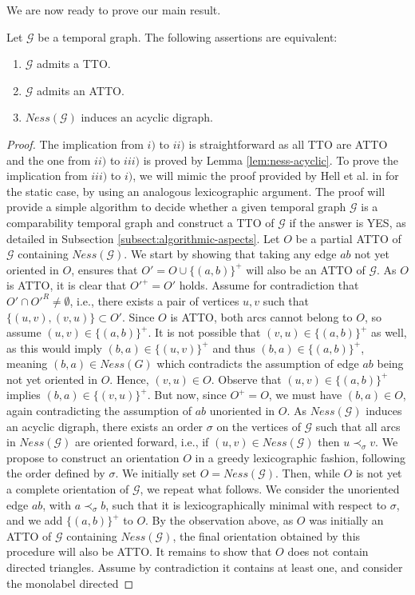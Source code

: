\documentclass[runningheads]{llncs}
\def\mG{\mathcal{G}}
\begin{document}
We are now ready to prove our main result.

\begin{theorem}
 Let $\mathcal{G}$ be a temporal graph. The following assertions are equivalent:
\begin{enumerate}[label=\roman*)]
     \item $\mG$ admits a TTO.
     \item $\mathcal{G}$ admits an ATTO.
     \item $Ness(\mathcal{G})$ induces an acyclic digraph.
\end{enumerate}
\label{theo:gouila-houri-generalization}
\end{theorem}

\begin{proof}
The implication from $i)$ to $ii)$ is straightforward as all TTO are ATTO and the one from $ii)$ to $iii)$ is proved by Lemma \ref{lem:ness-acyclic}. To prove the implication from $iii)$ to $i)$, we will mimic the proof provided by Hell et al. in \cite{hell1995lexicographic} for the static case, by using an analogous lexicographic argument. The proof will provide a simple algorithm to decide whether a given temporal graph $\mathcal{G}$ is a comparability temporal graph and construct a TTO of $\mathcal{G}$ if the answer is YES, as detailed in Subsection \ref{subsect:algorithmic-aspects}. Let $O$ be a partial ATTO of $\mathcal{G}$ containing $Ness(\mathcal{G})$. We start by showing that taking any edge $ab$ not yet oriented in $O$, ensures that $O'=O\cup\{(a,b)\}^+$ will also be an ATTO of $\mathcal{G}$. As $O$ is ATTO, it is clear that $O'^+=O'$ holds. Assume for contradiction that $O'\cap O'^{R} \neq \emptyset$, i.e., there exists a pair of vertices $u,v$ such that $\{(u,v),(v,u)\}\subset O'$. Since $O$ is ATTO, both arcs cannot belong to $O$, so assume $(u,v)\in \{(a,b)\}^+$. It is not possible that $(v,u)\in \{(a,b)\}^+$ as well, as this would imply $(b,a)\in \{(u,v)\}^+$ and thus $(b,a)\in \{(a,b)\}^+$, meaning $(b,a) \in Ness(G)$ which contradicts the assumption of edge $ab$ being not yet oriented in $O$. Hence, $(v,u)\in O$. Observe that $(u,v)\in \{(a,b)\}^+$ implies $(b,a)\in \{(v,u)\}^+$. But now, since $O^+=O$, we must have $(b,a)\in O$, again contradicting the assumption of $ab$ unoriented in $O$. As $Ness(\mathcal{G})$ induces an acyclic digraph, there exists an order $\sigma$ on the vertices of $\mathcal{G}$ such that all arcs in $Ness(\mathcal{G})$ are oriented forward, i.e., if $(u,v)\in Ness(\mathcal{G})$ then $u\prec_{\sigma} v$. We propose to construct an orientation $O$ in a greedy lexicographic fashion, following the order defined by $\sigma$. We initially set $O=Ness(\mathcal{G})$. Then, while $O$ is not yet a complete orientation of $\mathcal{G}$, we repeat what follows. We consider the unoriented edge $ab$, with $a \prec_{\sigma} b$, such that it is lexicographically minimal with respect to $\sigma$, and we add $\{(a,b)\}^+$ to $O$. By the observation above, as $O$ was initially an ATTO of $\mathcal{G}$ containing $Ness(\mathcal{G})$, the final orientation obtained by this procedure will also be ATTO. It remains to show that $O$ does not contain directed triangles. Assume by contradiction it contains at least one, and consider the monolabel directed 
\end{proof}
\end{document}
